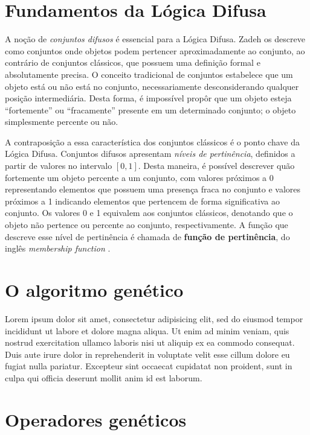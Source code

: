 \documentclass[12pt]{article}
\begin{document}
\section{Fundamentos da Lógica Difusa} \label{sec:fundaments}

A noção de \textit{conjuntos difusos} é essencial para a Lógica Difusa. Zadeh os descreve como conjuntos onde objetos podem pertencer aproximadamente ao conjunto, ao contrário de conjuntos clássicos, que possuem uma definição formal e absolutamente precisa. O conceito tradicional de conjuntos estabelece que um objeto está ou não está no conjunto, necessariamente desconsiderando qualquer posição intermediária. Desta forma, é impossível propôr que um objeto esteja ``fortemente'' ou ``fracamente'' presente em um determinado conjunto; o objeto simplesmente percente ou não.

A contraposição a essa característica dos conjuntos clássicos é o ponto chave da Lógica Difusa. Conjuntos difusos apresentam \textit{níveis de pertinência}, definidos a partir de valores no intervalo $[0, 1]$. Desta maneira, é possível descrever quão fortemente um objeto percente a um conjunto, com valores próximos a 0 representando elementos que possuem uma presença fraca no conjunto e valores próximos a 1 indicando elementos que pertencem de forma significativa ao conjunto. Os valores 0 e 1 equivalem aos conjuntos clássicos, denotando que o objeto não pertence ou percente ao conjunto, respectivamente. A função que descreve esse nível de pertinência é chamada de \textbf{função de pertinência}, do inglês \textit{membership function} \cite{Zadeh1965}.

\section{O algoritmo genético} \label{sec:algorithm}

Lorem ipsum dolor sit amet, consectetur adipisicing elit, sed do eiusmod tempor incididunt ut labore et dolore magna aliqua. Ut enim ad minim veniam, quis nostrud exercitation ullamco laboris nisi ut aliquip ex ea commodo consequat. Duis aute irure dolor in reprehenderit in voluptate velit esse cillum dolore eu fugiat nulla pariatur. Excepteur sint occaecat cupidatat non proident, sunt in culpa qui officia deserunt mollit anim id est laborum.

\section{Operadores genéticos} \label{sec:operators}
\end{document}
